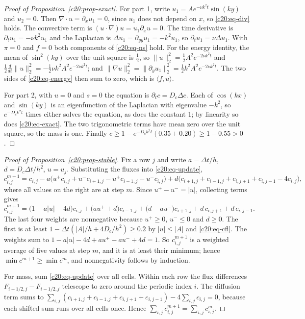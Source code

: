 \begin{proof}[Proof of Proposition~\ref{c20:prop-exact}]
For part 1, write $u_1=Ae^{-\nu k^2t}\sin(ky)$ and $u_2=0$. Then $\nabla\cdot u=\partial_xu_1=0$, since $u_1$ does not depend on $x$, so \eqref{c20:eq-div} holds. The convective term is $(u\cdot\nabla)u=u_1\partial_xu=0$. The time derivative is $\partial_tu_1=-\nu k^2u_1$ and the Laplacian is $\Delta u_1=\partial_{yy}u_1=-k^2u_1$,
so $\partial_tu_1=\nu\Delta u_1$. With $\pi=0$ and $f=0$ both components of \eqref{c20:eq-ns} hold. For the energy
identity, the mean of $\sin^2(ky)$ over the unit square is $\tfrac12$, so $\|u\|_2^2=\tfrac12A^2e^{-2\nu k^2t}$ and $\tfrac12\tfrac d{dt}\|u\|_2^2=-\tfrac12\nu k^2A^2e^{-2\nu k^2t}$; and $\|\nabla u\|_2^2=\|\partial_yu_1\|_2^2=\tfrac12k^2A^2e^{-2\nu k^2t}$. The two sides of \eqref{c20:eq-energy} then sum to
zero, which is $\langle f,u\rangle$.

For part 2, with $u=0$ and $s=0$ the equation is $\partial_tc=D_c\Delta c$. Each of $\cos(kx)$ and $\sin(ky)$
is an eigenfunction of the Laplacian with eigenvalue $-k^2$, so $e^{-D_ck^2t}$ times either solves the
equation, as does the constant 1; by linearity so does \eqref{c20:eq-exact}. The two trigonometric terms
have mean zero over the unit square, so the mass is one. Finally $c\ge1-e^{-D_ck^2t}(0.35+0.20)\ge1-0.55>0$.
\end{proof}

\begin{proof}[Proof of Proposition~\ref{c20:prop-stable}]
Fix a row $j$ and write $a=\Delta t/h$, $d=D_c\Delta t/h^2$, $u=u_j$. Substituting the fluxes into \eqref{c20:eq-update},
\[c^{m+1}_{i,j}=c_{i,j}-a\big(u^+c_{i,j}+u^-c_{i+1,j}-u^+c_{i-1,j}-u^-c_{i,j}\big)+d\big(c_{i+1,j}+c_{i-1,j}+c_{i,j+1}+c_{i,j-1}-4c_{i,j}\big),\]
where all values on the right are at step $m$. Since $u^+-u^-=|u|$, collecting terms gives
\[c^{m+1}_{i,j}=\big(1-a|u|-4d\big)c_{i,j}+\big(au^++d\big)c_{i-1,j}+\big(d-au^-\big)c_{i+1,j}+d\,c_{i,j+1}+d\,c_{i,j-1}.\]
The last four weights are nonnegative because $u^+\ge0$, $u^-\le0$ and $d\ge0$. The first is at least
$1-\Delta t(|A|/h+4D_c/h^2)\ge0.2$ by $|u|\le|A|$ and \eqref{c20:eq-cfl}. The weights sum to $1-a|u|-4d+au^+-au^-+4d=1$. So $c^{m+1}_{i,j}$ is a weighted average of five values at step $m$, and it is at least
their minimum; hence $\min c^{m+1}\ge\min c^m$, and nonnegativity follows by induction.

For mass, sum \eqref{c20:eq-update} over all cells. Within each row the flux differences $F_{i+1/2,j}-F_{i-1/2,j}$
telescope to zero around the periodic index $i$. The diffusion term sums to $\sum_{i,j}(c_{i+1,j}+c_{i-1,j}+c_{i,j+1}+c_{i,j-1})-4\sum_{i,j}c_{i,j}=0$, because each shifted sum runs over all cells once. Hence
$\sum_{i,j}c^{m+1}_{i,j}=\sum_{i,j}c^m_{i,j}$.
\end{proof}

